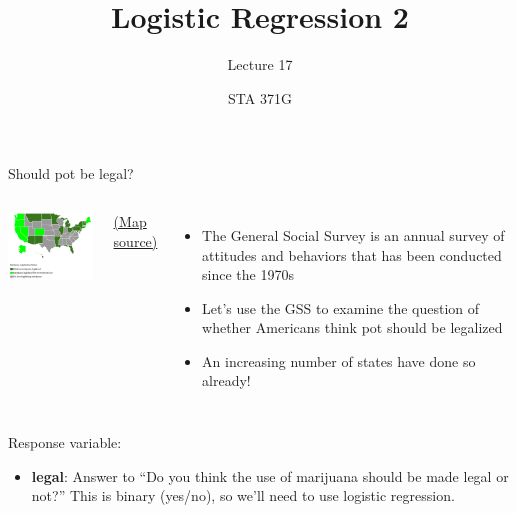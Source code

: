 \documentclass{beamer}\usepackage[]{graphicx}\usepackage[]{color}
\title{Logistic Regression 2}
\subtitle{Lecture 17}
\author{STA 371G}
\begin{document}
  
  

  \frame{\maketitle}



  \begin{darkframes}
    \begin{frame}{Should pot be legal?}
      \begin{columns}[onlytextwidth]
          \includegraphics[width=2in]{map}

          \begin{center}
            \fontsize{8}{8} 
            \href{http://www.governing.com/gov-data/state-marijuana-laws-map-medical-recreational.html}{(Map source)}
          \end{center}
        
          \begin{itemize}
            \item The General Social Survey is an annual survey of attitudes and behaviors that has been conducted since the 1970s
            \item Let's use the GSS to examine the question of whether Americans think pot should be legalized
            \item An increasing number of states have done so already!
          \end{itemize}
      \end{columns}
    \end{frame}

    \begin{frame}
      Response variable:
      \begin{itemize}
        \item \textbf{legal}: Answer to ``Do you think the use of marijuana should be made legal or not?'' \pause\alert{This is binary (yes/no), so we'll need to use logistic regression.}
      \end{itemize}


\end{frame}
\end{darkframes}
\end{document}

